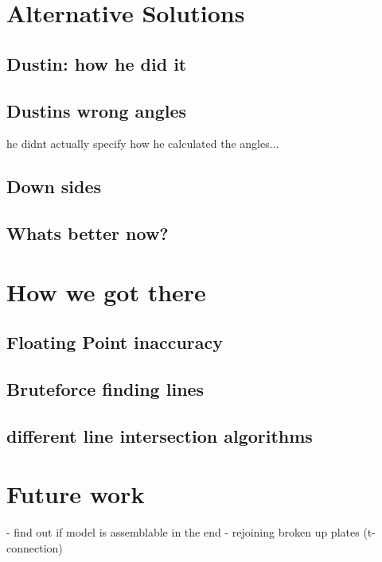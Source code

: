 \documentclass[../ClassicThesis.tex]{subfiles}
\begin{document}
\section{Alternative Solutions}
\subsection{Dustin: how he did it}
\subsection{Dustins wrong angles}
he didnt actually specify how he calculated the angles...
\subsection{Down sides}
\subsection{Whats better now?}

\section{How we got there}
\subsection{Floating Point inaccuracy}
\subsection{Bruteforce finding lines}
\subsection{different line intersection algorithms}

\section{Future work}
- find out if model is assemblable in the end
- rejoining broken up plates (t-connection)





\end{document}
